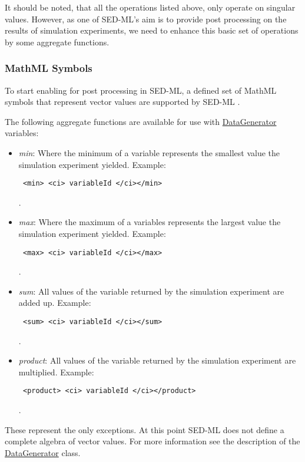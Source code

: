 It should be noted, that all the operations listed above, only operate on 
singular values. However, as one of SED-ML's aim is to provide post processing 
on the results of simulation experiments, we need to enhance this basic set of 
operations by some aggregate functions. 

\subsubsection{MathML Symbols}

To start enabling for post processing in SED-ML, a defined set of MathML symbols that 
represent vector values are supported by SED-ML \LoneVone. 


The following aggregate functions are available for use with \hyperref[class:dataGenerator]{DataGenerator} variables: 

\begin{itemize}\setlength{\parskip}{-0.1ex}

\item \emph{min}: Where the minimum of a variable represents the smallest value 
the simulation experiment yielded. Example: 

\begin{verbatim} <min> <ci> variableId </ci></min> \end{verbatim}.

\item \emph{max}: Where the maximum of a variables represents the largest value 
the simulation experiment yielded. Example: 

\begin{verbatim} <max> <ci> variableId </ci></max> \end{verbatim}.

\item \emph{sum}: All values of the variable returned by the simulation 
experiment are added up. Example: 

\begin{verbatim} <sum> <ci> variableId </ci></sum> \end{verbatim}.

\item \emph{product}: All values of the variable returned by the simulation 
experiment are multiplied. Example: 

\begin{verbatim} <product> <ci> variableId </ci></product> \end{verbatim}.

\end{itemize}

These represent the only exceptions. At this point SED-ML does not define a complete algebra of vector values. For more information see the description of the \hyperref[class:dataGenerator]{DataGenerator} class.

